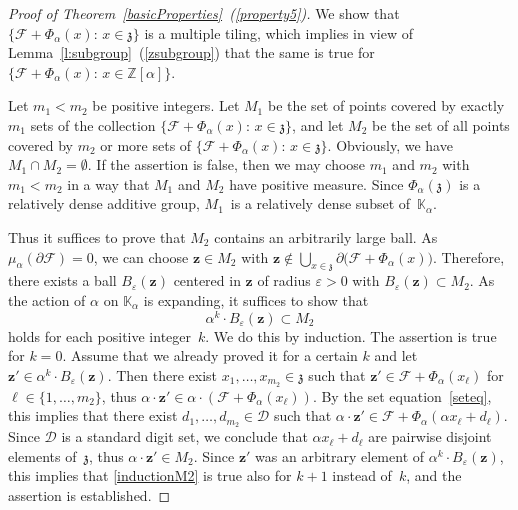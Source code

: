 \documentclass[12pt]{amsart}
\theoremstyle{definition}
\theoremstyle{remark}
\numberwithin{equation}{section}
\begin{document}
\begin{proof}[Proof of Theorem~\ref{basicProperties}~(\ref{property5})]
We show that $\{\mathcal{F} + \Phi_\alpha(x):\, x \in \mathfrak{z}\}$ is a multiple tiling, which implies in view of Lemma~\ref{l:subgroup}~(\ref{zsubgroup}) that the same is true for $\{\mathcal{F} + \Phi_\alpha(x):\, x \in \mathbb{Z}[\alpha]\}$.

Let $m_1<m_2$ be positive integers. Let $M_1$ be the set of points covered by exactly $m_1$ sets of the collection $\{\mathcal{F} + \Phi_\alpha(x):\, x \in \mathfrak{z}\}$, and let $M_2$ be the set of all points covered by $m_2$ or more sets of $\{\mathcal{F} + \Phi_\alpha(x):\, x \in \mathfrak{z}\}$.
Obviously, we have $M_1 \cap M_2 = \emptyset$.
If the assertion is false, then we may choose $m_1$ and $m_2$ with $m_1 < m_2$ in a way that $M_1$ and $M_2$ have positive measure.
Since $\Phi_\alpha(\mathfrak{z})$ is a relatively dense additive group, $M_1$~is a relatively dense subset of~$\mathbb{K}_\alpha$.

Thus it suffices to prove that $M_2$ contains an arbitrarily large ball.
As $\mu_\alpha(\partial\mathcal{F}) = 0$, we can choose $\mathbf{z} \in M_2$ with $\mathbf{z} \not\in \bigcup_{x \in \mathfrak{z}} \partial\big(\mathcal{F} + \Phi_\alpha(x)\big)$.
Therefore, there exists a ball $B_\varepsilon(\mathbf{z})$ centered in $\mathbf{z}$ of radius $\varepsilon>0$ with $B_\varepsilon(\mathbf{z}) \subset M_2$.
As the action of $\alpha$ on $\mathbb{K}_\alpha$ is expanding, it suffices to show that
\begin{equation}\label{inductionM2}
\alpha^k \cdot B_\varepsilon(\mathbf{z}) \subset M_2
\end{equation}
holds for each positive integer~$k$. We do this by induction. The assertion is true for $k=0$. Assume that we already proved it for a certain $k$ and let $\mathbf{z}' \in \alpha^{k} \cdot B_\varepsilon(\mathbf{z})$. Then there exist $x_1, \ldots, x_{m_2} \in \mathfrak{z}$ such that $\mathbf{z}' \in \mathcal{F} + \Phi_\alpha(x_\ell)$ for $\ell \in \{1,\ldots ,m_2\}$, thus $\alpha \cdot \mathbf{z}' \in \alpha \cdot (\mathcal{F} + \Phi_\alpha(x_\ell))$. By the set equation~\eqref{seteq}, this implies that there exist $d_1,\ldots,d_{m_2} \in \mathcal{D}$ such that $\alpha \cdot \mathbf{z}' \in \mathcal{F} + \Phi_\alpha(\alpha x_\ell + d_\ell)$.
Since $\mathcal{D}$ is a standard digit set, we conclude that $\alpha x_\ell  + d_\ell$ are pairwise disjoint elements of~$\mathfrak{z}$, thus $\alpha \cdot \mathbf{z}' \in M_2$. Since $\mathbf{z}'$ was an arbitrary element of $\alpha^k \cdot B_\varepsilon(\mathbf{z})$, this implies that \eqref{inductionM2} is true also for $k+1$ instead of~$k$, and the assertion is established.
\end{proof}
\end{document}

